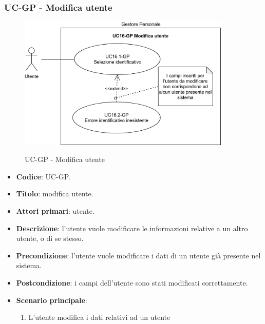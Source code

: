 \subsubsection{UC\theuccount-GP - Modifica utente}
		\begin{figure}[H]
			\centering
				\includegraphics[width=0.9\textwidth]{img/casi_d'uso/UC16.png}\\
			\caption{UC\theuccount-GP - Modifica utente}
		\end{figure}
	\begin{itemize}
		\item \textbf{Codice}: UC\theuccount-GP.
		\item \textbf{Titolo}: modifica utente.
		\item \textbf{Attori primari}: utente.
		\item \textbf{Descrizione}: l’utente vuole modificare le informazioni relative a un altro utente, o di se stesso.
		\item \textbf{Precondizione}: l'utente vuole modificare i dati di un utente già presente nel sistema.
		\item \textbf{Postcondizione}: i campi dell'utente sono stati modificati correttamente.
		\item \textbf{Scenario principale}:
		\begin{enumerate}
			\item L'utente modifica i dati relativi ad un utente
		\end{enumerate}
	\end{itemize}
